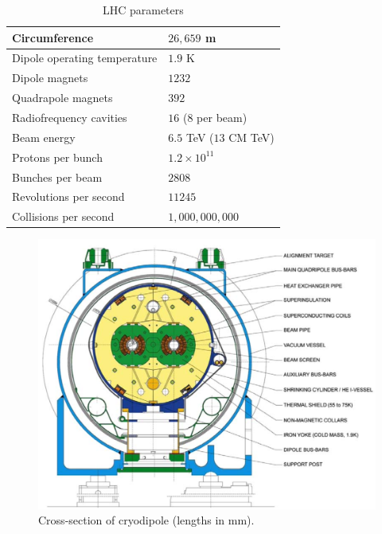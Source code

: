 		\begin{table}[!thp]
			\centering
			\caption{\gls{LHC} parameters  \cite{lhc-facts}}
			\begin{tabular}{| l | l |}  
			\hline
			Circumference 						& $26,659$ m 					\\ 	\hline
			Dipole operating temperature 		& $1.9$ K 						\\ 	\hline
			Dipole magnets 						& $1232$ 						\\	\hline
			Quadrapole magnets 					& $392$ 						\\	\hline
			Radiofrequency cavities 			& $16$ ($8$ per beam) 			\\ 	\hline
			Beam energy 						& $6.5$ TeV ($13$ CM TeV) 		\\ \hline
			Protons per bunch 					& $1.2 \times 10^{11}$ 			\\ \hline
			Bunches per beam 					& $2808$ 						\\ \hline
			Revolutions per second 				& $11245$ 						\\ \hline
			Collisions per second 				& $1,000,000,000$ 				\\ \hline
			\end{tabular}
			\label{tab:LHC}
		\end{table}

		\begin{figure}[!ht]
		\centering
		\includegraphics[width=\textwidth,keepaspectratio=true]{chapters/chapter3_experiment/images/dipole-crosssection.png}
		\caption{Cross-section of cryodipole (lengths in mm). \cite{lhc-machine}}
		\label{fig:dipole-xsec}
		\end{figure}

